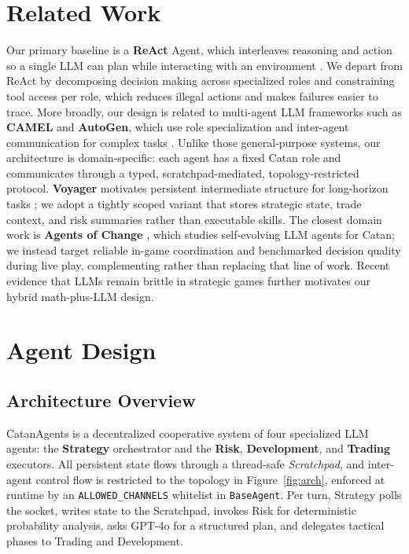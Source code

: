 \documentclass{article} %
\begin{document}
\section{Related Work}
\label{sec:related}

Our primary baseline is a \textbf{ReAct} Agent, which interleaves reasoning and action so a single LLM can plan while interacting with an environment \citep{yao2022react}. We depart from ReAct by decomposing decision making across specialized roles and constraining tool access per role, which reduces illegal actions and makes failures easier to trace. More broadly, our design is related to multi-agent LLM frameworks such as \textbf{CAMEL} and \textbf{AutoGen}, which use role specialization and inter-agent communication for complex tasks \citep{li2023camel,wu2023autogen}. Unlike those general-purpose systems, our architecture is domain-specific: each agent has a fixed Catan role and communicates through a typed, scratchpad-mediated, topology-restricted protocol. \textbf{Voyager} motivates persistent intermediate structure for long-horizon tasks \citep{wang2023voyager}; we adopt a tightly scoped variant that stores strategic state, trade context, and risk summaries rather than executable skills. The closest domain work is \textbf{Agents of Change} \citep{belle2025agentsofchange}, which studies self-evolving LLM agents for Catan; we instead target reliable in-game coordination and benchmarked decision quality during live play, complementing rather than replacing that line of work. Recent evidence that LLMs remain brittle in strategic games \citep{vidler2025playing} further motivates our hybrid math-plus-LLM design.

\section{Agent Design}
\label{sec:design}

\subsection{Architecture Overview}
\label{sec:arch}

CatanAgents is a decentralized cooperative system of four specialized LLM agents: the \textbf{Strategy} orchestrator and the \textbf{Risk}, \textbf{Development}, and \textbf{Trading} executors. All persistent state flows through a thread-safe \emph{Scratchpad}, and inter-agent control flow is restricted to the topology in Figure~\ref{fig:arch}, enforced at runtime by an \texttt{ALLOWED\_CHANNELS} whitelist in \texttt{BaseAgent}. Per turn, Strategy polls the socket, writes state to the Scratchpad, invokes Risk for deterministic probability analysis, asks GPT-4o for a structured plan, and delegates tactical phases to Trading and Development.
\end{document}
